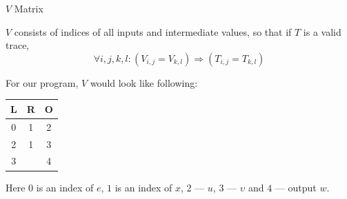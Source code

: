 \documentclass{zkdl-presentation-template}
\begin{document}
    \begin{frame} {$V$ Matrix}
        \begin{definition}
            $V$ consists of indices of all inputs and intermediate values, so that if $T$ is a valid trace,
            \[\forall i, j, k, l: (V_{i,j} = V_{k,l}) \Rightarrow (T_{i,j} = T_{k,l})\]
        \end{definition}
        \begin{example}
            For our program, $V$ would look like following:
            \begin{center}
                \begin{tabular}{|c|c|c|}
                    \hline
                    L & R & O \\
                    \hline
                    0 & 1 & 2 \\
                    \hline
                    2 & 1 & 3 \\
                    \hline
                    3 &  & 4 \\
                    \hline
                \end{tabular}
            \end{center}
            Here $0$ is an index of $e$, $1$ is an index of $x$, 2 --- $u$, 3 --- $\upsilon$ and $4$ --- output $w$.
        \end{example}
    \end{frame}
\end{document}
